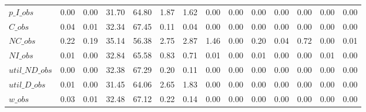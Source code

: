 \begin{center}
\begin{longtable}{lccccccccccccc}
$p\_I\_obs      $	 & 	            0.00	 & 	            0.00	 & 	           31.70	 & 	           64.80	 & 	            1.87	 & 	            1.62	 & 	            0.00	 & 	            0.00	 & 	            0.00	 & 	            0.00	 & 	            0.00	 & 	            0.00	 & 	            0.00 \\ 
$C\_obs         $	 & 	            0.04	 & 	            0.01	 & 	           32.34	 & 	           67.45	 & 	            0.11	 & 	            0.04	 & 	            0.00	 & 	            0.00	 & 	            0.00	 & 	            0.00	 & 	            0.00	 & 	            0.00	 & 	            0.00 \\ 
$NC\_obs        $	 & 	            0.22	 & 	            0.19	 & 	           35.14	 & 	           56.38	 & 	            2.75	 & 	            2.87	 & 	            1.46	 & 	            0.00	 & 	            0.20	 & 	            0.04	 & 	            0.72	 & 	            0.00	 & 	            0.01 \\ 
$NI\_obs        $	 & 	            0.01	 & 	            0.00	 & 	           32.84	 & 	           65.58	 & 	            0.83	 & 	            0.71	 & 	            0.01	 & 	            0.00	 & 	            0.01	 & 	            0.00	 & 	            0.00	 & 	            0.01	 & 	            0.00 \\ 
$util\_ND\_obs  $	 & 	            0.00	 & 	            0.00	 & 	           32.38	 & 	           67.29	 & 	            0.20	 & 	            0.11	 & 	            0.00	 & 	            0.00	 & 	            0.00	 & 	            0.00	 & 	            0.00	 & 	            0.00	 & 	            0.00 \\ 
$util\_D\_obs   $	 & 	            0.01	 & 	            0.00	 & 	           31.45	 & 	           64.06	 & 	            2.65	 & 	            1.83	 & 	            0.00	 & 	            0.00	 & 	            0.00	 & 	            0.00	 & 	            0.00	 & 	            0.00	 & 	            0.00 \\ 
$w\_obs         $	 & 	            0.03	 & 	            0.01	 & 	           32.48	 & 	           67.12	 & 	            0.22	 & 	            0.14	 & 	            0.00	 & 	            0.00	 & 	            0.00	 & 	            0.00	 & 	            0.00	 & 	            0.00	 & 	            0.00 \\ 
\end{longtable}
 \end{center}
